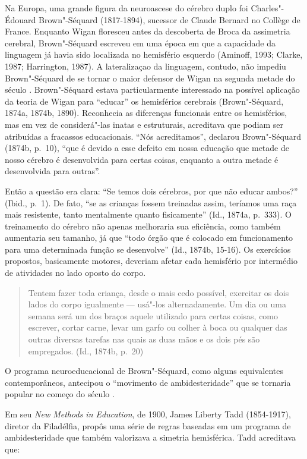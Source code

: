 Na Europa, uma grande figura da neuroascese do cérebro duplo foi
Charles"-Édouard Brown"-Séquard (1817-1894), sucessor de Claude Bernard no
Collège de France. Enquanto Wigan floresceu antes da descoberta de
Broca da assimetria cerebral, Brown"-Séquard escreveu em uma época em que
a capacidade da linguagem já havia sido localizada no hemisfério
esquerdo (Aminoff, 1993; Clarke, 1987; Harrington, 1987). A
lateralizaçao da linguagem, contudo, não impediu Brown"-Séquard de se
tornar o maior defensor de Wigan na segunda metade do século .
Brown"-Séquard estava particularmente interessado na possível aplicação
da teoria de Wigan para ``educar'' os hemisférios cerebrais
(Brown"-Séquard, 1874a, 1874b, 1890). Reconhecia as diferenças funcionais
entre os hemisférios, mas em vez de considerá"-las inatas e estruturais,
acreditava que podiam ser atribuídas a fracassos educacionais. ``Nós
acreditamos'', declarou Brown"-Séquard (1874b, p.~10), ``que é devido a
esse defeito em nossa educação que metade de nosso cérebro é
desenvolvida para certas coisas, enquanto a outra metade é desenvolvida
para outras''.

Então a questão era clara: ``Se temos dois cérebros, por que não educar
ambos?'' (Ibid., p.~1). De fato, ``se as crianças fossem treinadas assim,
teríamos uma raça mais resistente, tanto mentalmente quanto
fisicamente'' (Id., 1874a, p.~333). O treinamento do cérebro
não apenas melhoraria sua eficiência, como também aumentaria seu
tamanho, já que ``todo órgão que é colocado em funcionamento para uma
determinada função se desenvolve'' (Id., 1874b, 15-16). Os
exercícios propostos, basicamente motores, deveriam afetar cada
hemisfério por intermédio de atividades no lado oposto do corpo.

\begin{quote}
Tentem fazer toda criança, desde o mais cedo possível, exercitar os dois
lados do corpo igualmente --- usá"-los alternadamente. Um dia ou uma
semana será um dos braços aquele utilizado para certas coisas, como
escrever, cortar carne, levar um garfo ou colher à boca ou qualquer das
outras diversas tarefas nas quais as duas mãos e os dois pés são
empregados. (Id., 1874b, p.~20)
\end{quote}

O programa neuroeducacional de Brown"-Séquard, como alguns equivalentes
contemporâneos, antecipou o ``movimento de ambidesteridade'' que se
tornaria popular no começo do século .

Em seu \emph{New Methods in Education}, de 1900, James Liberty Tadd
(1854-1917), diretor da Filadélfia,
propôs uma série de regras baseadas em um programa de ambidesteridade
que também valorizava a simetria hemisférica. Tadd acreditava que:

